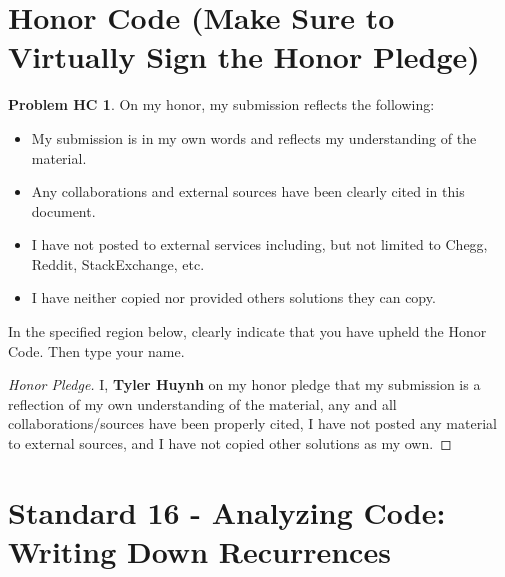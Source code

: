 \documentclass[11pt]{article}
\theoremstyle{definition}
\theoremstyle{definition}
\newtheorem*{requiredHC}{Problem HC}
\theoremstyle{definition}
\begin{document}
\section*{Honor Code (Make Sure to Virtually Sign the Honor Pledge)} 
\hypertarget{HonorCode}{}

\begin{requiredHC}
On my honor, my submission reflects the following:
\begin{itemize}
\item My submission is in my own words and reflects my understanding of the material.
\item Any collaborations and external sources have been clearly cited in this document.
\item I have not posted to external services including, but not limited to Chegg, Reddit, StackExchange, etc.
\item I have neither copied nor provided others solutions they can copy.
\end{itemize}

\noindent In the specified region below, clearly indicate that you have upheld the Honor Code. Then type your name. 
\end{requiredHC}

\begin{proof}[Honor Pledge]
I, \textbf{Tyler Huynh} on my honor pledge that my submission is a reflection of my own understanding of the material, any and all collaborations/sources have been properly cited, I have not posted any material to external sources, and I have not copied other solutions as my own.
\end{proof}



\newpage
\setcounter{section}{15}
\section{Standard 16 - Analyzing Code: Writing Down Recurrences}
\end{document}

